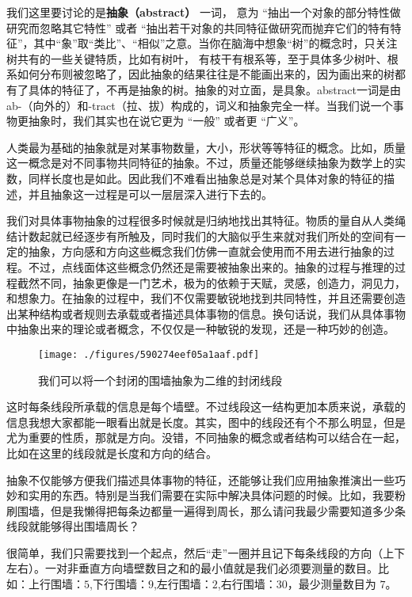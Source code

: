 
我们这里要讨论的是\textbf{抽象（abstract）} 一词， 意为 “抽出一个对象的部分特性做研究而忽略其它特性” 或者 “抽出若干对象的共同特征做研究而抛弃它们的特有特征”，其中“象”取“类比”、“相似”之意。当你在脑海中想象“树”的概念时，只关注树共有的一些关键特质，比如有树叶， 有枝干有根系等，至于具体多少树叶、根系如何分布则被忽略了，因此抽象的结果往往是不能画出来的，因为画出来的树都有了具体的特征了，不再是抽象的树。抽象的对立面，是具象。abstract一词是由ab-（向外的）和-tract（拉、拔）构成的，词义和抽象完全一样。当我们说一个事物更抽象时，我们其实也在说它更为 “一般” 或者更 “广义”。


人类最为基础的抽象就是对某事物数量，大小，形状等等特征的概念。比如，质量这一概念是对不同事物共同特征的抽象。不过，质量还能够继续抽象为数学上的实数，同样长度也是如此。因此我们不难看出抽象总是对某个具体对象的特征的描述，并且抽象这一过程是可以一层层深入进行下去的。

我们对具体事物抽象的过程很多时候就是归纳地找出其特征。物质的量自从人类绳结计数起就已经逐步有所触及，同时我们的大脑似乎生来就对我们所处的空间有一定的抽象，方向感和方向这些概念我们仿佛一直就会使用而不用去进行抽象的过程。不过，点线面体这些概念仍然还是需要被抽象出来的。抽象的过程与推理的过程截然不同，抽象更像是一门艺术，极为的依赖于天赋，灵感，创造力，洞见力，和想象力。在抽象的过程中，我们不仅需要敏锐地找到共同特性，并且还需要创造出某种结构或者规则去承载或者描述具体事物的信息。换句话说，我们从具体事物中抽象出来的理论或者概念，不仅仅是一种敏锐的发现，还是一种巧妙的创造。

\begin{figure}[ht]
\centering
\texttt{[image: ./figures/590274eef05a1aaf.pdf]}
\caption{我们可以将一个封闭的围墙抽象为二维的封闭线段} \label{fig_Abstra_1}
\end{figure}

这时每条线段所承载的信息是每个墙壁。不过线段这一结构更加本质来说，承载的信息我想大家都能一眼看出就是长度。其实，图中的线段还有个不那么明显，但是尤为重要的性质，那就是方向。没错，不同抽象的概念或者结构可以结合在一起，比如在这里的线段就是长度和方向的结合。

抽象不仅能够方便我们描述具体事物的特征，还能够让我们应用抽象推演出一些巧妙和实用的东西。特别是当我们需要在实际中解决具体问题的时候。比如，我要粉刷围墙，但是我懒得把每条边都量一遍得到周长，那么请问我最少需要知道多少条线段就能够得出围墙周长？

很简单，我们只需要找到一个起点，然后“走”一圈并且记下每条线段的方向（上下左右）。一对非垂直方向墙壁数目之和的最小值就是我们必须要测量的数目。比如：上行围墙：$5$,下行围墙：$9$,左行围墙：$2$,右行围墙：$30$，最少测量数目为 $7$。

